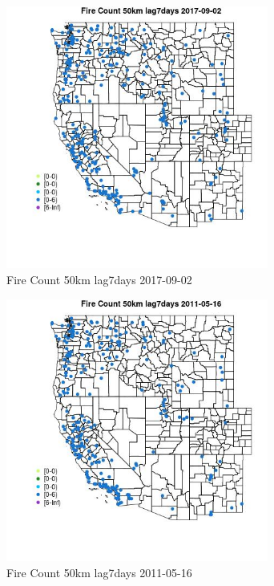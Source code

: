 \begin{figure} 
\centering  
\includegraphics[width=0.77\textwidth]{Code_Outputs/Report_ML_input_PM25_Step4_part_e_de_duplicated_aves_compiled_2019-05-21wNAs_MapObsFire_Count_50km_lag7days2017-09-02.jpg} 
\caption{\label{fig:Report_ML_input_PM25_Step4_part_e_de_duplicated_aves_compiled_2019-05-21wNAsMapObsFire_Count_50km_lag7days2017-09-02}Fire Count 50km lag7days 2017-09-02} 
\end{figure} 
 

\begin{figure} 
\centering  
\includegraphics[width=0.77\textwidth]{Code_Outputs/Report_ML_input_PM25_Step4_part_e_de_duplicated_aves_compiled_2019-05-21wNAs_MapObsFire_Count_50km_lag7days2011-05-16.jpg} 
\caption{\label{fig:Report_ML_input_PM25_Step4_part_e_de_duplicated_aves_compiled_2019-05-21wNAsMapObsFire_Count_50km_lag7days2011-05-16}Fire Count 50km lag7days 2011-05-16} 
\end{figure} 
 

